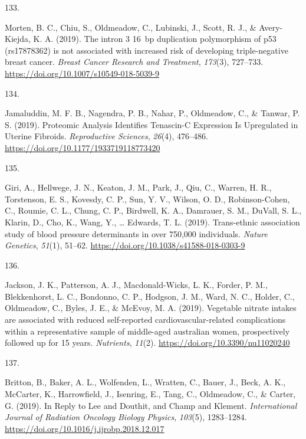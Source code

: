 \documentclass[11pt, a4paper]{awesome-cv}
\newlength{\csllabelwidth}
\newcommand{\CSLLeftMargin}[1]{\parbox[t]{\csllabelwidth}{#1}}
\newcommand{\CSLRightInline}[1]{\parbox[t]{\linewidth - \csllabelwidth}{#1}}
\begin{document}
\leavevmode\hypertarget{ref-morten_intron_2019}{}%
\CSLLeftMargin{133. }
\CSLRightInline{Morten, B. C., Chiu, S., Oldmeadow, C., Lubinski, J.,
Scott, R. J., \& Avery-Kiejda, K. A. (2019). The intron 3 16~bp
duplication polymorphism of p53 (rs17878362) is not associated with
increased risk of developing triple-negative breast cancer. \emph{Breast
Cancer Research and Treatment}, \emph{173}(3), 727--733.
\url{https://doi.org/10.1007/s10549-018-5039-9}}

\leavevmode\hypertarget{ref-jamaluddin_proteomic_2019}{}%
\CSLLeftMargin{134. }
\CSLRightInline{Jamaluddin, M. F. B., Nagendra, P. B., Nahar, P.,
Oldmeadow, C., \& Tanwar, P. S. (2019). Proteomic Analysis Identifies
Tenascin-C Expression Is Upregulated in Uterine Fibroids.
\emph{Reproductive Sciences}, \emph{26}(4), 476--486.
\url{https://doi.org/10.1177/1933719118773420}}

\leavevmode\hypertarget{ref-giri_trans-ethnic_2019}{}%
\CSLLeftMargin{135. }
\CSLRightInline{Giri, A., Hellwege, J. N., Keaton, J. M., Park, J., Qiu,
C., Warren, H. R., Torstenson, E. S., Kovesdy, C. P., Sun, Y. V.,
Wilson, O. D., Robinson-Cohen, C., Roumie, C. L., Chung, C. P.,
Birdwell, K. A., Damrauer, S. M., DuVall, S. L., Klarin, D., Cho, K.,
Wang, Y., \ldots{} Edwards, T. L. (2019). Trans-ethnic association study
of blood pressure determinants in over 750,000 individuals. \emph{Nature
Genetics}, \emph{51}(1), 51--62.
\url{https://doi.org/10.1038/s41588-018-0303-9}}

\leavevmode\hypertarget{ref-jackson_vegetable_2019}{}%
\CSLLeftMargin{136. }
\CSLRightInline{Jackson, J. K., Patterson, A. J., Macdonald-Wicks, L.
K., Forder, P. M., Blekkenhorst, L. C., Bondonno, C. P., Hodgson, J. M.,
Ward, N. C., Holder, C., Oldmeadow, C., Byles, J. E., \& McEvoy, M. A.
(2019). Vegetable nitrate intakes are associated with reduced
self-reported cardiovascular-related complications within a
representative sample of middle-aged australian women, prospectively
followed up for 15 years. \emph{Nutrients}, \emph{11}(2).
\url{https://doi.org/10.3390/nu11020240}}

\leavevmode\hypertarget{ref-britton_reply_2019}{}%
\CSLLeftMargin{137. }
\CSLRightInline{Britton, B., Baker, A. L., Wolfenden, L., Wratten, C.,
Bauer, J., Beck, A. K., McCarter, K., Harrowfield, J., Isenring, E.,
Tang, C., Oldmeadow, C., \& Carter, G. (2019). In Reply to Lee and
Douthit, and Champ and Klement. \emph{International Journal of Radiation
Oncology Biology Physics}, \emph{103}(5), 1283--1284.
\url{https://doi.org/10.1016/j.ijrobp.2018.12.017}}
\end{document}
